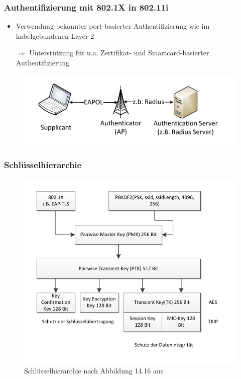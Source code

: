 \documentclass{beamer}
\begin{document}
\begin{frame}
	\frametitle{Authentifizierung mit 802.1X in 802.11i}
	\begin{itemize}
		\item Verwendung bekannter port-basierter Authentifizierung wie im kabelgebundenen Layer-2
		\item[$\Rightarrow$] Unterstützung für u.a. Zertifikat- und Smartcard-basierter Authentifizierung
	\end{itemize}
	\begin{figure}
		\includegraphics[scale=0.7]{figures/ap_radius.pdf}

	\end{figure}
\end{frame}

\begin{frame}
\frametitle{Schlüsselhierarchie}
	\begin{figure}
		\includegraphics[scale=0.7]{figures/key_hier.pdf}
		\caption{Schlüsselhierarchie nach Abbildung 14.16 aus \cite{books/daglib/0008794}}
	\end{figure}
\end{frame}
\end{document}
